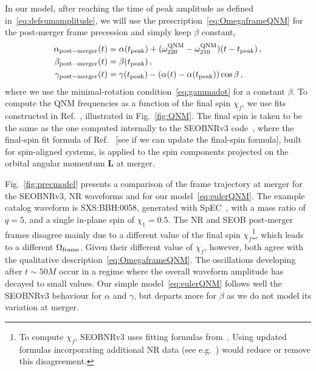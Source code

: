 \documentclass[aps,showpacs,twocolumn,
prd,superscriptaddress,nofootinbib]{revtex4-1}
\newcommand{\SM}[1]{{\color{Red} #1}}
\begin{document}
In our model, after reaching the time of peak amplitude as defined in~\eqref{eq:defsumamplitude}, we will use the prescription~\eqref{eq:OmegaframeQNM} for the post-merger frame precession and simply keep $\beta$ constant,
\begin{subequations}\label{eq:eulerQNM}
\begin{align}
	\alpha_{\rm post-merger}(t) &= \alpha(t_{\rm peak}) + (\omega_{220}^{\rm QNM} - \omega_{210}^{\rm QNM})(t-t_{\rm peak}) \,, \\
	\beta_{\rm post-merger}(t) &= \beta(t_{\rm peak}) \,, \\
	\gamma_{\rm post-merger}(t) &= \gamma(t_{\rm peak}) - (\alpha(t) - \alpha(t_{\rm peak}) )\cos \beta \,,
\end{align}
\end{subequations}
where we use the minimal-rotation condition~\eqref{eq:gammadot} for a constant $\beta$. To compute the QNM frequencies as a function of the final spin $\chi_{f}$, we use fits constructed in Ref.~\cite{Berti+05}, illustrated in Fig.~\ref{fig:QNM}. The final spin is taken to be the same as the one computed internally to the SEOBNRv3 code~\cite{Pan+13, BTB16}, where the final-spin fit formula of Ref.~\cite{BR09} \SM{[see if we can update the final-spin formula]}, built for spin-aligned systems, is applied to the spin components projected on the orbital angular momentum $\bm{L}$ at merger.

Fig.~\ref{fig:precmodel} presents a comparison of the frame trajectory at merger for the SEOBNRv3, NR waveforms and for our model~\eqref{eq:eulerQNM}. The example catalog waveform is SXS:BBH:0058, generated with SpEC~\cite{SXScatalog, SpEC, Mroue+12, Mroue+13}, with a mass ratio of $q=5$, and a single in-plane spin of $\chi_{1} = 0.5$. The NR and SEOB post-merger frames disagree mainly due to a different value of the final spin $\chi_{f}$\footnote{To compute $\chi_{f}$, SEOBNRv3 uses fitting formulas from~\cite{BR09}. Using updated formulas incorporating additional NR data (see e.g.~\cite{HBR16}) would reduce or remove this disagreement.}, which leads to a different $\Omega_{\rm frame}$. Given their different value of $\chi_{f}$, however, both agree with the qualitative description~\eqref{eq:OmegaframeQNM}. The oscillations developing after $t\sim 50 M$ occur in a regime where the overall waveform amplitude has decayed to small values. Our simple model~\eqref{eq:eulerQNM} follows well the SEOBNRv3 behaviour for $\alpha$ and $\gamma$, but departs more for $\beta$ as we do not model its variation at merger.
\end{document}
